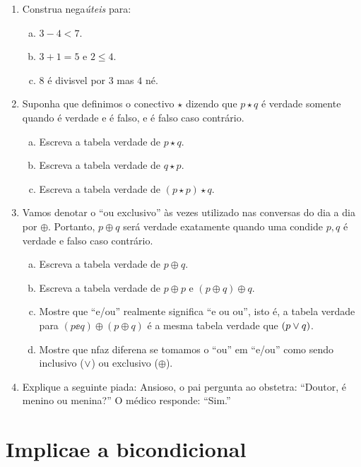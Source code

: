 \begin{enumerate}[{\bf 1.}]
\item Construa nega\coes \emph{\'uteis} para:
\begin{enumerate}[a)]
\item $3-4<7$.
\item $3+1=5$ e $2 \leq 4$.
\item $8$ \'e divis\ih vel por 3 mas $4$ n\ao \'e.
\end{enumerate}

\item Suponha que definimos o conectivo $\star$ dizendo que $p \star q$ \'e verdade somente quando \qq \'e verdade e \pp \'e falso, e \'e falso caso contr\'ario. \label{exerc:1.2-5}
\begin{enumerate}[a)]
\item Escreva a tabela verdade de $p \star q$. 
\item Escreva a tabela verdade de $q \star p$.
\item Escreva a tabela verdade de $(p \star p) \star q$.
\end{enumerate}

\item Vamos denotar o ``ou exclusivo'' \`as vezes utilizado nas conversas do dia a dia por $\oplus$. Portanto, $p\oplus q$ ser\'a verdade exatamente quando uma condi\cao de $p,q$ \'e verdade e falso caso contr\'ario.
\begin{enumerate}[a)]
\item Escreva a tabela verdade de $p \oplus q$.
\item Escreva a tabela verdade de $p \oplus p$ e $(p \oplus q) \oplus q$.
\item Mostre que ``e/ou'' realmente significa ``e ou ou'', isto \'e, a tabela verdade para $(p \ee q)\oplus(p \oplus q)$ \'e a mesma tabela verdade que $(p \vee q)$.
\item Mostre que n\ao faz diferen\cc a se tomamos o ``ou'' em ``e/ou'' como sendo inclusivo ($\vee$) ou exclusivo ($\oplus$).
\end{enumerate}

\item Explique a seguinte piada: Ansioso, o pai pergunta ao obstetra: ``Doutor, \'e menino ou menina?'' O m\'edico responde: ``Sim.''
\end{enumerate}

\section{Implica\cao e a bicondicional}\label{implicacao}

